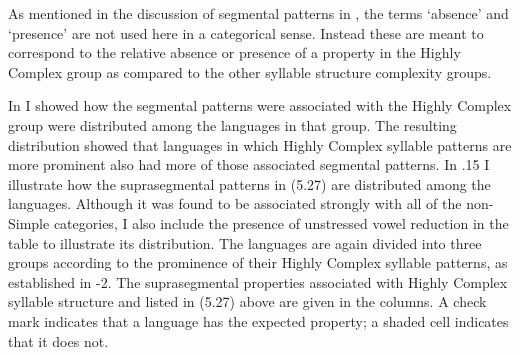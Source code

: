   As mentioned in the discussion of segmental patterns in , the terms ‘absence’ and ‘presence’ are not used here in a categorical sense. Instead these are meant to correspond to the relative absence or presence of a property in the Highly Complex group as compared to the other syllable structure complexity groups.



  In  I showed how the segmental patterns were associated with the Highly Complex group were distributed among the languages in that group. The resulting distribution showed that languages in which Highly Complex syllable patterns are more prominent also had more of those associated segmental patterns. In .15 I illustrate how the suprasegmental patterns in (5.27) are distributed among the languages. Although it was found to be associated strongly with all of the non-Simple categories, I also include the presence of unstressed vowel reduction in the table to illustrate its distribution. The languages are again divided into three groups according to the prominence of their Highly Complex syllable patterns, as established in -2. The suprasegmental properties associated with Highly Complex syllable structure and listed in (5.27) above are given in the columns. A check mark indicates that a language has the expected property; a shaded cell indicates that it does not. 






